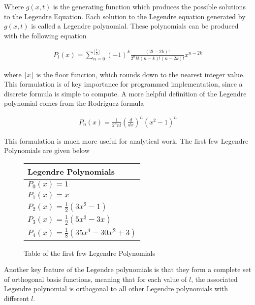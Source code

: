         \noindent Where $g(x, t)$ is the generating function which produces the possible solutions to the Legendre Equation. Each solution to the Legendre equation generated by $g(x, t)$ is called a Legendre polynomial. These polynomials can be produced with the following equation

        \begin{align}
            P_l(x) = \sum_{n = 0}^{\lfloor \frac{l}{2} \rfloor} (-1)^k \frac{(2l - 2k)!}{2^n k! (n - k)!(n - 2k)!}x^{n-2k}
        \end{align}

        \noindent where $\lfloor x \rfloor$ is the floor function, which rounds down to the nearest integer value. This formulation is of key importance for programmed implementation, since a discrete formula is simple to compute. A more helpful definition of the Legendre polynomial comes from the Rodriguez formula \cite{Arfken_Weber_Arfken_Weber_2008}

        \begin{align}
            P_n(x) = \frac{1}{2^n n!} \left( \frac{d}{dx} \right)^n (x^2 - 1)^n
        \end{align}

        \noindent This formulation is much more useful for analytical work. The first few Legendre Polynomials are given below

        \begin{figure}
            \centering
            \begin{tabular}{l}
                Legendre Polynomials\\
                \hline
                $P_0(x) = 1$\\
                $P_1(x) = x$\\
                $P_2(x) = \frac{1}{2}\left(3x^2 - 1\right)$\\
                $P_3(x) = \frac{1}{2} \left(5x^3 - 3x\right)$ \\
                $P_4(x) = \frac{1}{8} \left(35x^4 - 30x^2 + 3 \right)$\\
                \hline
            \end{tabular}
            \caption{Table of the first few Legendre Polynomials}
            \label{tab:Legendre_Polynomials}
        \end{figure}

        \noindent Another key feature of the Legendre polynomials is that they form a complete set of orthogonal basis functions, meaning that for each value of $l$, the associated Legendre polynomial is orthogonal to all other Legendre polynomials with different $l$.

